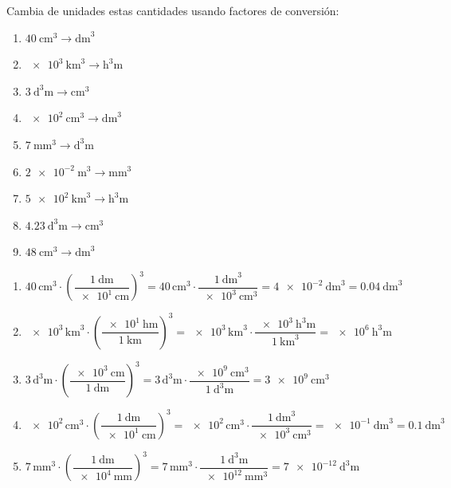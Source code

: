 \begin{exercise}
    Cambia de unidades estas cantidades usando factores de conversión:
    \begin{enumerate}[label=\letraminuscula]
        \item \(\qty{40}{\cubic\cm} \to \unit{\cubic\dm}\)
        \item \(\qty{e3}{\cubic\km} \to \unit{\cubic\hecto\m}\)
        \item \(\qty{3}{\cubic\deca\m} \to \unit{\cubic\cm}\)
        \item \(\qty{e2}{\cubic\cm} \to \unit{\cubic\dm}\)
        \item \(\qty{7}{\cubic\mm} \to \unit{\cubic\deca\m}\)
        \item \(\qty{2e-2}{\cubic\m} \to \unit{\cubic\mm}\)
        \item \(\qty{5e2}{\cubic\km} \to \unit{\cubic\hecto\m}\)
        \item \(\qty{4.23}{\cubic\deca\m} \to \unit{\cubic\cm}\)
        \item \(\qty{48}{\cubic\cm} \to \unit{\cubic\dm}\)
    \end{enumerate}
    \begin{solu}
        \begin{enumerate}[label=\alph*)]
            \item \(\num{40}\,\unit{\cubic\cm} \cdot \left(\dfrac{\qty{1}{\dm}}{\qty{e1}{\cm}}\right)^{3} = \num{40}\,\unit{\cubic\cm} \cdot \dfrac{\qty{1}{\cubic\dm}}{\qty{e3}{\cubic\cm}} = \qty{4e-2}{\cubic\dm} = \qty{0.04}{\cubic\dm}\)
            \item \(\num{e3}\,\unit{\cubic\km} \cdot \left(\dfrac{\qty{e1}{\hecto\m}}{\qty{1}{\km}}\right)^{3} = \num{e3}\,\unit{\cubic\km} \cdot \dfrac{\qty{e3}{\cubic\hecto\m}}{\qty{1}{\cubic\km}} = \qty{e6}{\cubic\hecto\m}\)
            \item \(\num{3}\,\unit{\cubic\deca\m} \cdot \left(\dfrac{\qty{e3}{\cm}}{\qty{1}{\deca\m}}\right)^{3} = \num{3}\,\unit{\cubic\deca\m} \cdot \dfrac{\qty{e9}{\cubic\cm}}{\qty{1}{\cubic\deca\m}} = \qty{3e9}{\cubic\cm}\)
            \item \(\num{e2}\,\unit{\cubic\cm} \cdot \left(\dfrac{\qty{1}{\dm}}{\qty{e1}{\cm}}\right)^{3} = \num{e2}\,\unit{\cubic\cm} \cdot \dfrac{\qty{1}{\cubic\dm}}{\qty{e3}{\cubic\cm}} = \qty{e-1}{\cubic\dm} = \qty{0.1}{\cubic\dm}\)
            \item \(\num{7}\,\unit{\cubic\mm} \cdot \left(\dfrac{\qty{1}{\deca\m}}{\qty{e4}{\mm}}\right)^{3} = \num{7}\,\unit{\cubic\mm} \cdot \dfrac{\qty{1}{\cubic\deca\m}}{\qty{e12}{\cubic\mm}} = \qty{7e-12}{\cubic\deca\m}\)

\end{enumerate}
\end{solu}
\end{exercise}
